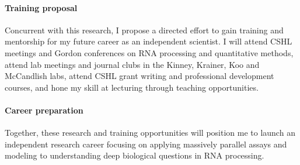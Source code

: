 \documentclass[11pt]{article}
\begin{document}
\paragraph{Training proposal}
Concurrent with this research, I propose a directed effort to gain training and mentorship for my future career as an independent scientist.
I will attend CSHL meetings and Gordon conferences on RNA processing and quantitative methods, attend lab meetings and journal clubs in the Kinney, Krainer, Koo and McCandlish labs, attend CSHL grant writing and professional development courses, and hone my skill at lecturing through teaching opportunities.
%
\paragraph{Career preparation}
Together, these research and training opportunities will position me to launch an independent research career focusing on applying massively parallel assays and modeling to understanding deep biological questions in RNA processing.

\printbibliography
\end{document}
